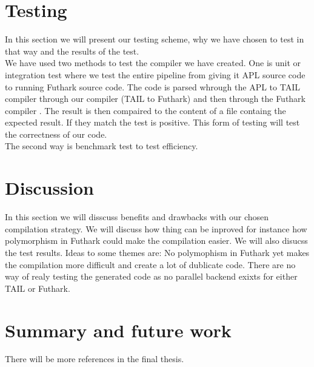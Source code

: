 \documentclass[11pt]{article}
\begin{document}
\section{Testing}
In this section we will present our testing scheme, why we have chosen to test in that way and the results of the test.\\


We have used two methods to test the compiler we have created. One is unit or integration test where we test the entire pipeline from giving it APL source code to running Futhark source code. The code is parsed whrough the APL to TAIL compiler \cite{ElsmanDybdal:Array:2014} through our compiler (TAIL to Futhark) and then through the Futhark compiler \cite{TroelsHenriksen}. The result is then compaired to the content of a file containg the expected result. If they match the test is positive. This form of testing will test the correctness of our code. \\

The second way is benchmark test to test efficiency. 


\section{Discussion}
In this section we will disscuss benefits and drawbacks with our chosen compilation strategy. We will discuss how thing can be inproved for instance how polymorphism in Futhark could make the compilation easier. We will also disucss the test results. Ideas to some themes are: No polymophism in Futhark yet makes the compilation more difficult and create a lot of dublicate code. There are no way of realy testing the generated code as no parallel backend exixts for either TAIL or Futhark.

\section{Summary and future work}




{}


There will be more references in the final thesis. 
\end{document}
